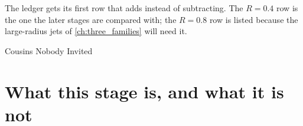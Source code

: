 The ledger gets its first row that adds instead of subtracting. The $R=0.4$
row is the one the later stages are compared with; the $R=0.8$ row is
listed because the large-radius jets of \cref{ch:three_families} will need
it.

\begin{ledger}{Cousins Nobody Invited}
\end{ledger}

\section{What this stage is, and what it is not}
\label{sec:uninvited_cousins:caveats}

